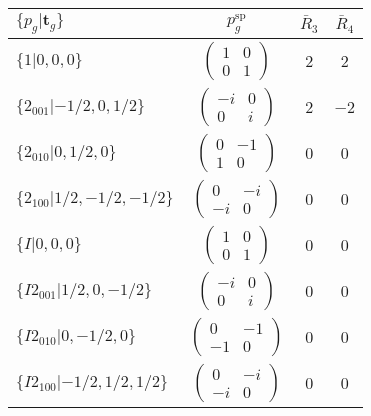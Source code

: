 \documentclass[3p,preprint]{elsarticle}
\newcommand{\bt}{\bm{t}}
\begin{document}
\begin{table}[H]
		\begin{tabular}{|l|c||c|c|}\hline
			$\{p_g|\bt_g\}$ & $p_g^{\text{sp}}$ & $\bar{R}_3$ & $\bar{R}_4$  \\ \hline \hline
			$\{1|0,0,0\}$ & 					$\left(\begin{array}{cc} 1&0 \\ 0&1 \end{array}\right)$	& $2$ &  $2$ \\ \hline
			$\{2_{001}|-1/2,0,1/2\}$ &		$\left(\begin{array}{cc} -i&0 \\ 0&i \end{array}\right)$	& $2$ & $-2$  \\ \hline
			$\{2_{010}|0,1/2,0\}$ &			$\left(\begin{array}{cc} 0&-1 \\ 1&0 \end{array}\right)$	& $0$ & $0$\\ \hline
			$\{2_{100}|1/2,-1/2,-1/2\}$ &		$\left(\begin{array}{cc} 0&-i \\ -i&0 \end{array}\right)$	& $0$ & $0$\\ \hline
			$\{I|0,0,0\}$ & 						$\left(\begin{array}{cc} 1&0 \\ 0&1 \end{array}\right)$	& $0$ &  $0$\\ \hline
			$\{I2_{001}|1/2,0,-1/2\}$ &		$\left(\begin{array}{cc} -i&0 \\ 0&i \end{array}\right)$	& $0$ & $0$  \\ \hline
			$\{I2_{010}|0,-1/2,0\}$ &			$\left(\begin{array}{cc} 0&-1 \\ -1&0 \end{array}\right)$	& $0$ & $0$\\ \hline
			$\{I2_{100}|-1/2,1/2,1/2\}$ &		$\left(\begin{array}{cc} 0&-i \\ -i&0 \end{array}\right)$	& $0$ & $0$\\ \hline
	\end{tabular}
\end{table}
\end{document}
